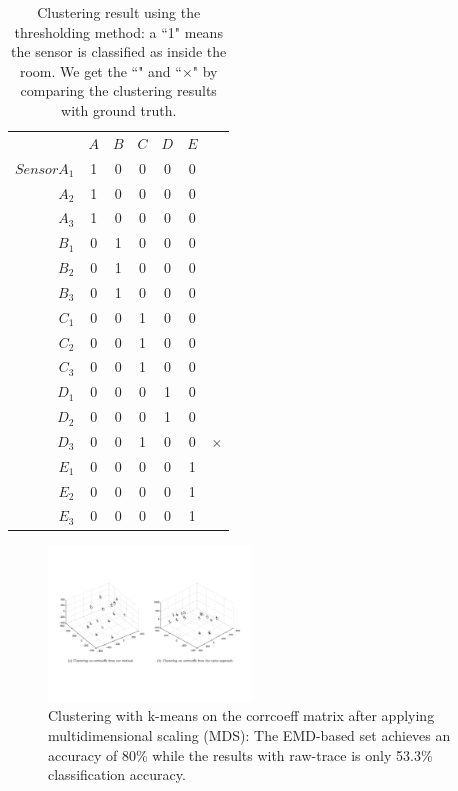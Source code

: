 \begin{table}[h!]\footnotesize
 \begin{center}
	\begin{tabular}{ r|c|c|c|c|c|c }
	\multicolumn{1}{r}{}
	 &  \multicolumn{1}{c}{$A$}
	 & \multicolumn{1}{c}{$B$}
	 & \multicolumn{1}{c}{$C$}
	 & \multicolumn{1}{c}{$D$}
	  & \multicolumn{1}{c}{$E$} \\
	\cline{2-6} 
	$SensorA_{1}$ & 1 & 0 & 0 & 0 & 0 & \checkmark\\
	\cline{2-6}
	$A_{2}$ & 1 & 0 & 0 & 0 & 0 & \checkmark\\
	\cline{2-6}
	$A_{3}$ & 1 & 0 & 0 & 0 & 0 & \checkmark\\
	\cline{2-6}
	$B_{1}$ & 0 & 1 & 0 & 0 & 0 & \checkmark\\
	\cline{2-6}
	$B_{2}$ & 0 & 1 & 0 & 0 & 0 & \checkmark\\
	\cline{2-6}
	$B_{3}$ & 0 & 1 & 0 & 0 & 0 & \checkmark\\
	\cline{2-6}
	$C_{1}$ & 0 & 0 & 1 & 0 & 0 & \checkmark\\
	\cline{2-6}
	$C_{2}$ & 0 & 0 & 1 & 0 & 0 & \checkmark\\
	\cline{2-6}
	$C_{3}$ & 0 & 0 & 1 & 0 & 0 & \checkmark\\
	\cline{2-6}
	$D_{1}$ & 0 & 0 & 0 & 1 & 0 & \checkmark\\
	\cline{2-6}
	$D_{2}$ & 0 & 0 & 0 & 1 & 0 & \checkmark\\
	\cline{2-6}
	$D_{3}$ & 0 & 0 & 1 & 0 & 0 & $\times$\\
	\cline{2-6}
	$E_{1}$ & 0 & 0 & 0 & 0 & 1 & \checkmark\\
	\cline{2-6}
	$E_{2}$ & 0 & 0 & 0 & 0 & 1 & \checkmark\\
	\cline{2-6}
	$E_{3}$ & 0 & 0 & 0 & 0 & 1 & \checkmark\\
	\cline{2-6}
	\end{tabular}
 \end{center}
 \caption{Clustering result using the thresholding method: a ``1" means the sensor is classified as inside the room. We get the ``\checkmark" and ``$\times$" by comparing the clustering results with ground truth.}
 \label{tab:cluster}
\end{table}

\begin{figure}[ht!]
\centering
	\includegraphics[width=0.48\textwidth]{figs/Space_KmeanClustering}
\caption{Clustering with k-means on the corrcoeff matrix after applying multidimensional scaling (MDS): The EMD-based set achieves an accuracy of 80\% while the results with raw-trace is only 53.3\% classification accuracy.}
\label{fig:mds}
\end{figure}

